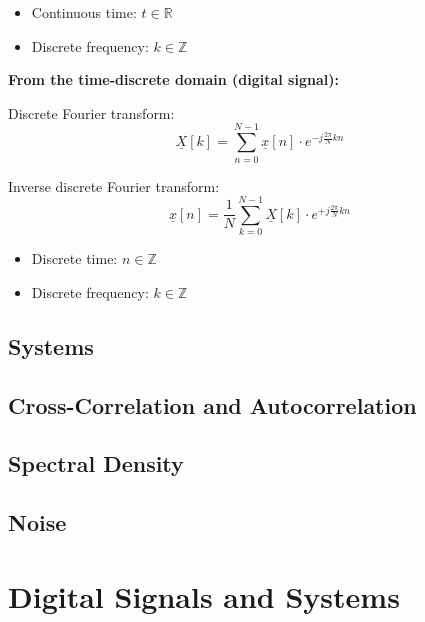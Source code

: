 \begin{refsection}
\begin{minipage}{0.45\linewidth}
	\begin{itemize}
		\item Continuous time: $t \in \mathbb{R}$
		\item Discrete frequency: $k \in \mathbb{Z}$
	\end{itemize}
\end{minipage}
\hfill
\begin{minipage}{0.45\linewidth}
	\textbf{From the time-discrete domain (digital signal):}
	
	\vspace{0.5em}
	
	Discrete Fourier transform:
	\begin{equation*}
		\underline{X}[k] = \sum\limits_{n = 0}^{N - 1} \underline{x}[n] \cdot e^{- j \frac{2 \pi}{N} k n}
	\end{equation*}
	
	Inverse discrete Fourier transform:
	\begin{equation*}
		\underline{x}[n] = \frac{1}{N} \sum\limits_{k = 0}^{N - 1} \underline{X}[k]  \cdot e^{+ j \frac{2 \pi}{N} k n}
	\end{equation*}
	
	\begin{itemize}
		\item Discrete time: $n \in \mathbb{Z}$
		\item Discrete frequency: $k \in \mathbb{Z}$
	\end{itemize}
\end{minipage}

\subsection{Systems}

\subsection{Cross-Correlation and Autocorrelation}

\subsection{Spectral Density}

\subsection{Noise}

\section{Digital Signals and Systems}


\end{refsection}
